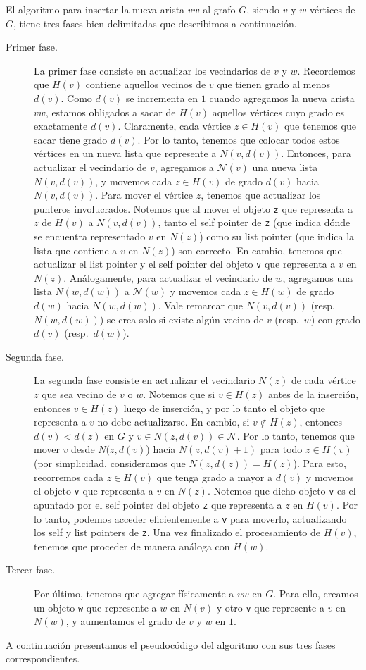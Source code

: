 \documentclass[%
    a4paper,%
    12pt,%
    twoside,%
    openright,%
    halfparskip,%
    cleardoubleempty,%
    bigheadings,%
    titlepage,%
    headsepline%
]{scrbook}
\newcommand{\N}{\mathcal{N}}
\begin{document}
El algoritmo para insertar la nueva arista $vw$ al grafo $G$, siendo $v$ y $w$ vértices de $G$, tiene tres fases bien delimitadas que describimos a continuación.
\begin{description}
\item [Primer fase.] La primer fase consiste en actualizar los vecindarios de $v$ y $w$.  Recordemos que $H(v)$ contiene aquellos vecinos de $v$ que tienen grado al menos $d(v)$.  Como $d(v)$ se incrementa en $1$ cuando agregamos la nueva arista $vw$, estamos obligados a sacar de $H(v)$ aquellos vértices cuyo grado es exactamente $d(v)$.  Claramente, cada vértice $z \in H(v)$ que tenemos que sacar tiene grado $d(v)$.  Por lo tanto, tenemos que colocar todos estos vértices en un nueva lista que represente a $N(v, d(v))$.  Entonces, para actualizar el vecindario de $v$,  agregamos a $\N(v)$ una nueva lista $N(v,d(v))$, y movemos cada $z \in H(v)$ de grado $d(v)$ hacia $N(v,d(v))$.  Para mover el vértice $z$, tenemos que actualizar los punteros involucrados.  Notemos que al mover el objeto \texttt{z} que representa a $z$ de $H(v)$ a $N(v, d(v))$, tanto el self pointer de \texttt{z} (que indica dónde se encuentra representado $v$ en $N(z)$) como su list pointer (que indica la lista que contiene a $v$ en $N(z)$) son correcto.  En cambio, tenemos que actualizar el list pointer y el self pointer del objeto \texttt{v} que representa a $v$ en $N(z)$.  Análogamente, para actualizar el vecindario de $w$, agregamos una lista $N(w, d(w))$ a $\N(w)$ y movemos cada $z \in H(w)$ de grado $d(w)$ hacia $N(w, d(w))$.  Vale remarcar que $N(v,d(v))$ (resp.\ $N(w, d(w))$) se crea solo si existe algún vecino de $v$ (resp.\ $w$) con grado $d(v)$ (resp.\ $d(w)$).  

\item [Segunda fase.]  La segunda fase consiste en actualizar el vecindario $N(z)$ de cada vértice $z$ que sea vecino de $v$ o $w$.  Notemos que si $v \in H(z)$ antes de la inserción, entonces $v \in H(z)$ luego de inserción, y por lo tanto el objeto que representa a $v$ no debe actualizarse.  En cambio, si $v \not\in H(z)$, entonces $d(v) < d(z)$ en $G$ y $v \in N(z, d(v)) \in \N$.  Por lo tanto, tenemos que mover $v$ desde $N(z,d(v)$) hacia $N(z, d(v)+1)$ para todo $z \in H(v)$ (por simplicidad, consideramos que $N(z, d(z)) = H(z)$).  Para esto, recorremos cada $z \in H(v)$ que tenga grado a mayor a $d(v)$ y movemos el objeto \texttt{v} que representa a $v$ en $N(z)$.  Notemos que dicho objeto \texttt{v} es el apuntado por el self pointer del objeto \texttt{z} que representa a $z$ en $H(v)$.  Por lo tanto, podemos acceder eficientemente a \texttt{v} para moverlo, actualizando los self y list pointers de \texttt{z}.  Una vez finalizado el procesamiento de $H(v)$, tenemos que proceder de manera análoga con $H(w)$.
%
\item [Tercer fase.] Por último, tenemos que agregar físicamente a $vw$ en $G$.  Para ello, creamos un objeto \texttt{w} que represente a $w$ en $N(v)$ y otro \texttt{v} que represente a $v$ en $N(w)$, y aumentamos el grado de $v$ y $w$ en $1$.
\end{description}
A continuación presentamos el pseudocódigo del algoritmo con sus tres fases correspondientes.
\end{document}
